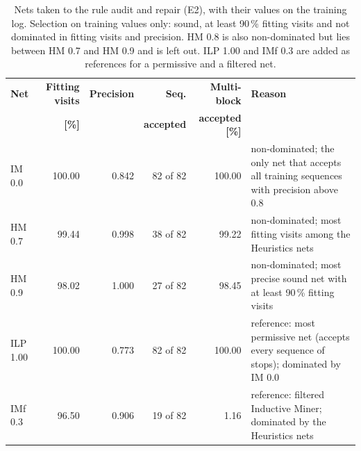 \begin{table}[htbp]
\centering
\small
\begin{tabularx}{\textwidth}{lrrrrY}
\toprule
\textbf{Net} & \textbf{Fitting visits} & \textbf{Precision} & \textbf{Seq.} & \textbf{Multi-block} & \textbf{Reason} \\
 & \textbf{[\%]} & & \textbf{accepted} & \textbf{accepted [\%]} & \\
\midrule
IM 0.0 & 100.00 & 0.842 & 82 of 82 & 100.00 & non-dominated; the only net that accepts all training sequences with precision above 0.8 \\
HM 0.7 & 99.44 & 0.998 & 38 of 82 & 99.22 & non-dominated; most fitting visits among the Heuristics nets \\
HM 0.9 & 98.02 & 1.000 & 27 of 82 & 98.45 & non-dominated; most precise sound net with at least 90\,\% fitting visits \\
ILP 1.00 & 100.00 & 0.773 & 82 of 82 & 100.00 & reference: most permissive net (accepts every sequence of stops); dominated by IM 0.0 \\
IMf 0.3 & 96.50 & 0.906 & 19 of 82 & 1.16 & reference: filtered Inductive Miner; dominated by the Heuristics nets \\
\bottomrule
\end{tabularx}
\caption{Nets taken to the rule audit and repair (E2), with their values on the training log. Selection on training values only: sound, at least 90\,\% fitting visits and not dominated in fitting visits and precision. HM 0.8 is also non-dominated but lies between HM 0.7 and HM 0.9 and is left out. ILP 1.00 and IMf 0.3 are added as references for a permissive and a filtered net.}
\label{tab:rq1_e2_candidates}
\end{table}
